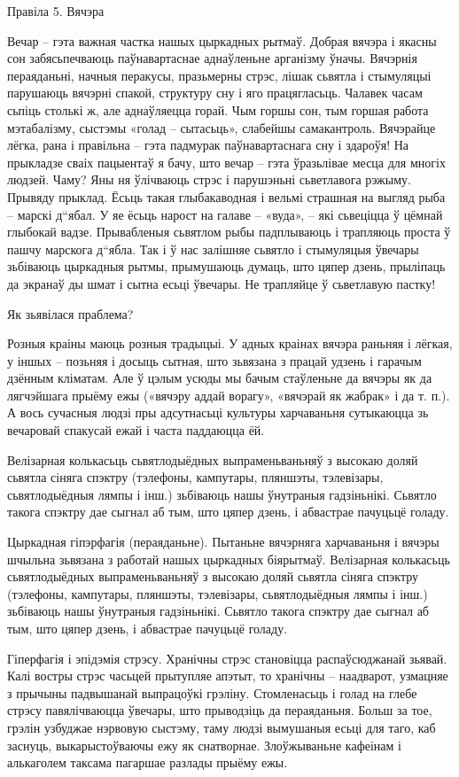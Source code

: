 Правіла 5. Вячэра

Вечар – гэта важная частка нашых цыркадных рытмаў. Добрая вячэра і якасны сон забясьпечваюць паўнавартаснае аднаўленьне арганізму ўначы. Вячэрнія пераяданьні, начныя перакусы, празьмерны стрэс, лішак сьвятла і стымуляцыі парушаюць вячэрні спакой, структуру сну і яго працягласьць. Чалавек часам сьпіць столькі ж, але аднаўляецца горай. Чым горшы сон, тым горшая работа мэтабалізму, сыстэмы «голад – сытасьць», слабейшы самакантроль. Вячэрайце лёгка, рана і правільна – гэта падмурак паўнавартаснага сну і здароўя!
На прыкладзе сваіх пацыентаў я бачу, што вечар – гэта ўразьлівае месца для многіх людзей. Чаму? Яны ня ўлічваюць стрэс і парушэньні сьветлавога рэжыму. Прывяду прыклад. Ёсьць такая глыбакаводная і вельмі страшная на выгляд рыба – марскі д“ябал. У яе ёсьць нарост на галаве – «вуда», – які сьвеціцца ў цёмнай глыбокай вадзе. Прывабленыя сьвятлом рыбы падплываюць і трапляюць проста ў пашчу марскога д“ябла. Так і ў нас залішняе сьвятло і стымуляцыя ўвечары зьбіваюць цыркадныя рытмы, прымушаюць думаць, што цяпер дзень, прыліпаць да экранаў ды шмат і сытна есьці ўвечары. Не трапляйце ў сьветлавую пастку!

Як зьявілася праблема?

Розныя краіны маюць розныя традыцыі. У адных краінах вячэра раньняя і лёгкая, у іншых – позьняя і досыць сытная, што зьвязана з працай удзень і гарачым дзённым кліматам. Але ў цэлым усюды мы бачым стаўленьне да вячэры як да лягчэйшага прыёму ежы («вячэру аддай ворагу», «вячэрай як жабрак» і да т. п.). А вось сучасныя людзі пры адсутнасьці культуры харчаваньня сутыкаюцца зь вечаровай спакусай ежай і часта паддаюцца ёй.

Велізарная колькасьць сьвятлодыёдных выпраменьваньняў з высокаю доляй сьвятла сіняга спэктру (тэлефоны, кампутары, пляншэты, тэлевізары, сьвятлодыёдныя лямпы і інш.) зьбіваюць нашы ўнутраныя гадзіньнікі. Сьвятло такога спэктру дае сыгнал аб тым, што цяпер дзень, і абвастрае пачуцьцё голаду.

Цыркадная гіпэрфагія (пераяданьне).
Пытаньне вячэрняга харчаваньня і вячэры шчыльна зьвязана з работай нашых цыркадных біярытмаў. Велізарная колькасьць сьвятлодыёдных выпраменьваньняў з высокаю доляй сьвятла сіняга спэктру (тэлефоны, кампутары, пляншэты, тэлевізары, сьвятлодыёдныя лямпы і інш.) зьбіваюць нашы ўнутраныя гадзіньнікі. Сьвятло такога спэктру дае сыгнал аб тым, што цяпер дзень, і абвастрае пачуцьцё голаду.

Гіперфагія і эпідэмія стрэсу.
Хранічны стрэс становіцца распаўсюджанай зьявай. Калі востры стрэс часьцей прытупляе апэтыт, то хранічны – наадварот, узмацняе з прычыны падвышанай выпрацоўкі грэліну. Стомленасьць і голад на глебе стрэсу павялічваюцца ўвечары, што прыводзіць да пераяданьня. Больш за тое, грэлін узбуджае нэрвовую сыстэму, таму людзі вымушаныя есьці для таго, каб заснуць, выкарыстоўваючы ежу як снатворнае. Злоўжываньне кафеінам і алькаголем таксама пагаршае разлады прыёму ежы.

